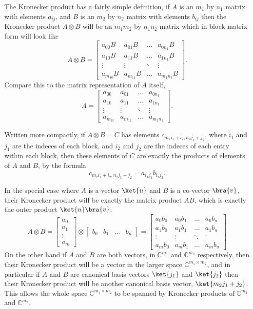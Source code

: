 The Kronecker product has a fairly simple definition, if $A$ is an $m_1$ by $n_1$ matrix with elements $a_{ij}$, and $B$ is an $m_2$ by $n_2$ matrix with elements $b_{ij}$ then the Kronecker product $A \otimes B$ will be an $m_1m_2$ by $n_1n_2$ matrix which in block matrix form will look like
\[
A\otimes B = \left[\begin{matrix}
		a_{00}B & a_{01}B & \dots & a_{0n_1}B\\
		a_{10}B & a_{11}B & \dots & a_{1n_1}B\\
		\vdots & \vdots & \ddots & \vdots\\
		a_{m_10}B & a_{m_11}B & \dots & a_{m_1n_1}B
	\end{matrix}\right].
\]
Compare this to the matrix representation of $A$ itself,
\[
	A = \left[\begin{matrix}
	a_{00} & a_{01} & \dots & a_{0n_1}\\
	a_{10} & a_{11} & \dots & a_{1n_1}\\
	\vdots & \vdots & \ddots & \vdots\\
	a_{m_10} & a_{m_11} & \dots & a_{m_1n_1}
\end{matrix}\right].
\]

Written more compactly, if $A\otimes B = C$ has elements $c_{m_2i_1 + i_2,n_2j_1+j_2}$, where $i_1$ and $j_1$ are the indeces of each block, and $i_2$ and $j_2$ are the indeces of each entry within each block, then these elements of $C$ are exactly the products of elements of $A$ and $B$, by the formula
\[c_{m_2i_1 + i_2,n_2j_1+j_2} = a_{i_1j_1}b_{i_2j_2}.\]

In the special case where $A$ is a vector $\ket{u}$ and $B$ is a co-vector $\bra{v}$, their Kronecker product will be exactly the matrix product $AB$, which is exactly the outer product $\ket{u}\bra{v}$:
\[
A \otimes B =
\left[\begin{matrix}
	a_0\\a_1\\\vdots\\a_m
\end{matrix}\right]
\otimes
\left[\begin{matrix}
	b_0&b_1&\dots&b_n
\end{matrix}\right]
=
\left[\begin{matrix}
	a_0b_0 & a_0b_1 & \dots & a_0b_n\\
	a_1b_0 & a_1b_1 & \dots & a_1b_n\\
	\vdots & \vdots & \ddots & \vdots\\
	a_mb_0 & a_mb_1 & \dots & a_mb_n
\end{matrix}\right]
\]
On the other hand if $A$ and $B$ are both vectors, in $\mathbb{C}^{m_1}$ and $\mathbb{C}^{m_2}$ respectively, then their Kronecker product will be a vector in the larger space $\mathbb{C}^{m_1\times m_2}$, and in particular if $A$ and $B$ are canonical basis vectors $\ket{j_1}$ and $\ket{j_2}$ then their Kronecker product will be another canonical basis vector, $\ket{m_2j_1 + j_2}$. This allows the whole space $\mathbb{C}^{m_1 \times m_2}$ to be spanned by Kronecker products of $\mathbb{C}^{m_1}$ and $\mathbb{C}^{m_2}$.

